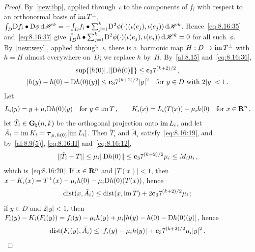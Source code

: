 \begin{proof}
    By~\ref{new:ibp}, applied through~$\iota$ to the components of $f_i$ with respect to an
    orthonormal basis of $\operatorname{im} T^\perp$, ${\textstyle\int_{D}^{}} \mathrm{D} f_i \bullet \mathrm{D} \phi \,\mathrm{d} \mathscr{H}^{k} = -
    {\textstyle\int_{D}^{}} f_i \bullet {\textstyle\sum_{j=1}^{k}} \mathrm{D}^2 \phi(\cdot)(\iota(e_j),\iota(e_j)) \,\mathrm{d}
    \mathscr{H}^{k}$. Hence~\eqref{eq:8.16:35} and~\eqref{eq:8.16:37} give ${\textstyle\int_{D}^{}} h \bullet
    {\textstyle\sum_{j=1}^{k}} \mathrm{D}^2 \phi(\cdot)(\iota(e_j),\iota(e_j)) \,\mathrm{d} \mathscr{H}^{k} = 0$
    for all such~$\phi$. By~\ref{new:weyl}, applied through~$\iota$, there is a~harmonic map $H : D
    \to \operatorname{im} T^\perp$ with $h = H$ almost everywhere on~$D$; we replace $h$ by~$H$. By~\ref{al:8.15}
    and~\eqref{eq:8.16:36},
    \begin{equation}
        \label{eq:8.16:H}
        \begin{gathered}
        \sup \{ |h(0)|, \|\mathrm{D} h(0)\| \} \le \mathbf{c}_3 7^{(k+2)/2} \,, \\ |h(y) - h(0) - \mathrm{D}
        h(0)(y)| \le \mathbf{c}_3 7^{(k+2)/2} |y|^2 \quad \text{for $y \in D$ with $2 |y| < 1$}
        \,.
        \end{gathered}
    \end{equation}
    Let
    \begin{displaymath}
        L_i(y) = y + \mu_i \mathrm{D} h(0)(y) \quad \text{for $y \in \operatorname{im} T$} \,, \qquad K_i(x) = L_i(T(x)) +
        \mu_i h(0) \quad \text{for $x \in \mathbf{R}^{n}$} \,,
    \end{displaymath}
    let $\tilde T_i \in \mathbf{G}_{\natural}(n,k)$ be the orthogonal projection onto $\operatorname{im} L_i$, and let
    $\tilde A_i = \operatorname{im} K_i = \boldsymbol{\tau}_{\mu_i h(0)}[\operatorname{im} L_i]$. Then $\tilde T_i$ and $\tilde A_i$
    satisfy~\eqref{eq:8.16:19}, and by~\ref{al:8.9(5)}, \eqref{eq:8.16:H} and~\eqref{eq:8.16:12},
    \begin{equation}
        \label{eq:8.16:39}
        \|\tilde T_i - T\| \le \mu_i \|\mathrm{D} h(0)\| \le \mathbf{c}_3 7^{(k+2)/2} \mu_i \le M_i
        \mu_i \,,
    \end{equation}
    which is~\eqref{eq:8.16:20}. If $x \in \mathbf{R}^{n}$ and $|T(x)| < 1$, then $x - K_i(x) =
    T^\perp(x) - \mu_i h(0) - \mu_i \mathrm{D} h(0)(T(x))$, hence
    \begin{equation}
        \label{eq:8.16:40}
        \operatorname{dist}(x, \tilde A_i) \le \operatorname{dist}(x, \operatorname{im} T) + 2 \mathbf{c}_3 7^{(k+2)/2} \mu_i \,;
    \end{equation}
    if $y \in D$ and $2 |y| < 1$, then $F_i(y) - K_i(F_i(y)) = f_i(y) - \mu_i h(y) + \mu_i [h(y) -
    h(0) - \mathrm{D} h(0)(y)]$, hence
    \begin{equation}
        \label{eq:8.16:41}
        \operatorname{dist}(F_i(y), \tilde A_i) \le |f_i(y) - \mu_i h(y)| + \mathbf{c}_3 7^{(k+2)/2} \mu_i
        |y|^2 \,.
    \end{equation}


\end{proof}
